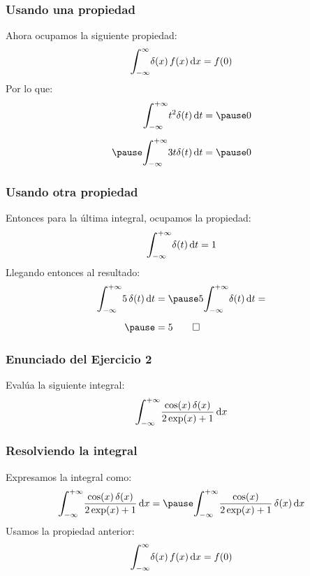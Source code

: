 \documentclass[12pt]{beamer}
\begin{document}
\begin{frame}
\frametitle{Usando una propiedad}
Ahora ocupamos la siguiente propiedad:
\pause
\begin{align*}
\scaleint{6ex}_{\bs -\infty}^{\infty} \delta (x) \, f (x) \dd{x} = f (0)
\end{align*}
\pause
Por lo que:
\begin{eqnarray*}
\begin{aligned}
\scaleint{6ex}_{\bs -\infty}^{+\infty} t^{2} \delta (t) \dd{t} = \pause 0 \\[0.5em] \pause
\scaleint{6ex}_{\bs -\infty}^{+\infty} 3 t \delta (t) \dd{t} =  \pause 0
\end{aligned}
\end{eqnarray*}
\end{frame}

\begin{frame}
\frametitle{Usando otra propiedad}
Entonces para la última integral, ocupamos la propiedad:
\pause
\begin{align*}
\scaleint{6ex}_{\bs -\infty}^{+\infty} \delta (t) \dd{t} =  1
\end{align*}
\pause
Llegando entonces al resultado:
\begin{eqnarray*}
\begin{aligned}
\scaleint{6ex}_{\bs -\infty}^{+\infty} 5 \, \delta (t) \dd{t} &= \pause 5 \scaleint{6ex}_{\bs -\infty}^{+\infty} \delta (t) \dd{t} = \\[0.5em] \pause
&= 5 \qed
\end{aligned}
\end{eqnarray*}
\end{frame}

\begin{frame}
\frametitle{Enunciado del Ejercicio 2}
Evalúa la siguiente integral:
\pause
\begin{align*}
\scaleint{6ex}_{\bs -\infty}^{+\infty} \dfrac{\cos (x) \, \delta (x)}{2 \exp(x) + 1}  \dd{x}
\end{align*}
\end{frame}

\begin{frame}
\frametitle{Resolviendo la integral}
Expresamos la integral como:
\pause
\begin{eqnarray*}
\begin{aligned}
\scaleint{6ex}_{\bs -\infty}^{+\infty} \dfrac{\cos (x) \, \delta (x)}{2 \exp(x) + 1} \dd{x} = \pause  
\scaleint{6ex}_{\bs -\infty}^{+\infty} \dfrac{\cos (x)}{2 \exp(x) + 1} \, \delta (x) \dd{x}
\end{aligned}
\end{eqnarray*}
\pause
Usamos la propiedad anterior:
\begin{align*}
\scaleint{6ex}_{\bs -\infty}^{\infty} \delta (x) \, f (x) \dd{x} = f (0)
\end{align*}
\end{frame}
\end{document}
